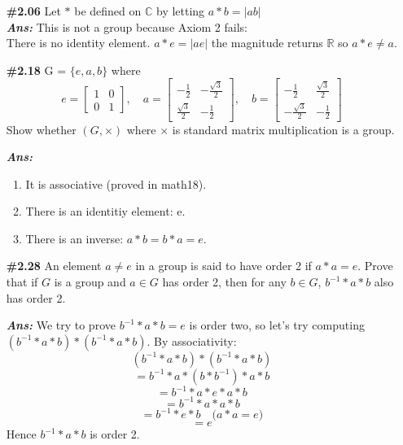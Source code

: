 \documentclass[12pt]{article}
\newcommand{\sol}{\setlength{\parindent}{0cm}\textbf{\textit{Ans:}}\setlength{\parindent}{1cm} }
\begin{document}
\begin{enumerate}[start=1,label={\bfseries Question \arabic*:},leftmargin=1in] %
  \item[\textbf{\#2.06}] 
  Let $*$ be defined on $\mathbb{C}$ by letting $a*b = |ab|$\\
  \sol{
  This is not a group because Axiom 2 fails:\\
  There is no identity element. $a * e = |ae|$ the magnitude returns $\mathbb{R}$ so $a*e \neq a$.
  }

  \item [\textbf{\#2.18}]
    G = $\{e, a, b\}$
    where 
    \[ e = \begin{bmatrix}
    1 & 0 \\
    0 & 1
    \end{bmatrix}, \quad 
    a = \begin{bmatrix}
    -\frac{1}{2} & -\frac{\sqrt{3}}{2} \\
    \frac{\sqrt{3}}{2} & -\frac{1}{2}
    \end{bmatrix}, \quad 
    b = \begin{bmatrix}
    -\frac{1}{2} & \frac{\sqrt{3}}{2} \\
    -\frac{\sqrt{3}}{2} & -\frac{1}{2}
    \end{bmatrix} \]
  Show whether $(G, \times)$ where $\times$ is standard matrix multiplication is a group.

  \sol{}
  \begin{enumerate}[label=\alph*.]
    \item It is associative (proved in math18).
    \item There is an identitiy element: e.
    \item There is an inverse: $a*b = b*a = e$. 
  \end{enumerate}
  \item [\textbf{\#2.28}]
  An element \( a \neq e \) in a group is said to have order 2 if \( a * a = e \). Prove that if \( G \) is a group and \( a \in G \) has order 2, then for any \( b \in G \), \( b^{-1} * a * b \) also has order 2.

  \sol{} We try to prove $b^{-1} * a * b = e$ is order two, so let's try computing $(b^{-1} * a * b) * (b^{-1} * a * b)$. By associativity:
  \[(b^{-1} * a * b) * (b^{-1} * a * b)\]
  \[= b^{-1} * a * (b * b^{-1}) * a * b\]
  \[= b^{-1} * a * e * a * b\]
  \[= b^{-1} * a * a * b\]
  \[= b^{-1} * e * b \quad \text{($a*a=e$)}\]
  \[= e\]
  Hence $b^{-1} * a * b$ is order 2.


\end{enumerate}
\end{document}

